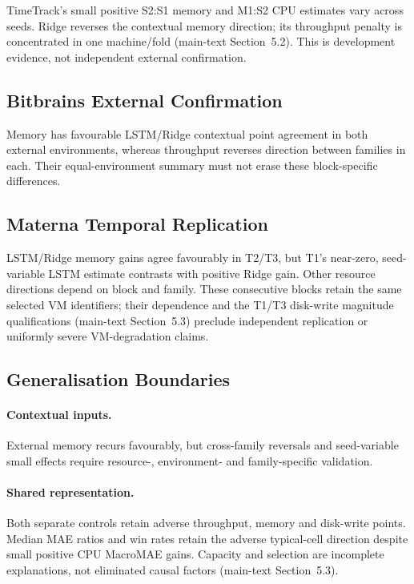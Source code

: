 \documentclass[a4paper,11pt]{article}
\begin{document}
TimeTrack's small positive S2:S1 memory and M1:S2 CPU estimates vary across
seeds. Ridge reverses the contextual memory direction; its throughput penalty
is concentrated in one machine/fold (main-text Section~5.2).
This is development evidence, not independent external confirmation.

\subsection*{Bitbrains External Confirmation}

Memory has favourable LSTM/Ridge contextual point agreement in both external
environments, whereas throughput reverses direction between families in each.
Their equal-environment summary must not erase these block-specific differences.

\subsection*{Materna Temporal Replication}

LSTM/Ridge memory gains agree favourably in T2/T3, but T1's near-zero,
seed-variable LSTM estimate contrasts with positive Ridge gain. Other resource
directions depend on block and family. These consecutive blocks retain the
same selected VM identifiers; their dependence and the T1/T3 disk-write
magnitude qualifications (main-text Section~5.3) preclude independent
replication or uniformly severe VM-degradation claims.

\subsection*{Generalisation Boundaries}

\paragraph{Contextual inputs.}
External memory recurs favourably, but cross-family reversals and seed-variable
small effects require resource-, environment- and family-specific validation.

\paragraph{Shared representation.}
Both separate controls retain adverse throughput, memory and disk-write
points. Median MAE ratios and win rates retain the adverse typical-cell
direction despite small positive CPU MacroMAE gains. Capacity and selection
are incomplete explanations, not eliminated causal factors
(main-text Section~5.3).
\end{document}

